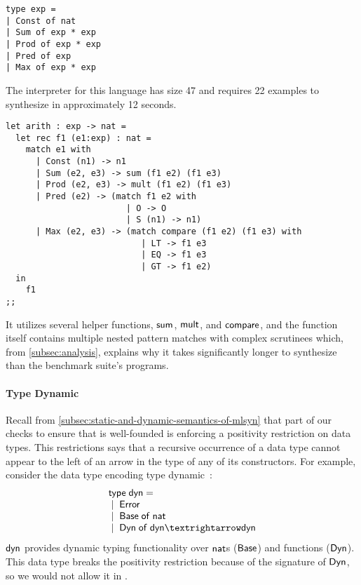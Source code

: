 \begin{center}
  \begin{minipage}{0.25\textwidth}
    \begin{lstlisting}
type exp =
| Const of nat
| Sum of exp * exp
| Prod of exp * exp
| Pred of exp
| Max of exp * exp
    \end{lstlisting}
  \end{minipage}
\end{center}

The interpreter for this language has size 47 and requires 22 examples to synthesize in approximately 12 seconds.

\begin{center}
  \begin{minipage}{0.75\textwidth}
    \begin{lstlisting}
let arith : exp -> nat =
  let rec f1 (e1:exp) : nat =
    match e1 with
      | Const (n1) -> n1
      | Sum (e2, e3) -> sum (f1 e2) (f1 e3)
      | Prod (e2, e3) -> mult (f1 e2) (f1 e3)
      | Pred (e2) -> (match f1 e2 with
                        | O -> O
                        | S (n1) -> n1)
      | Max (e2, e3) -> (match compare (f1 e2) (f1 e3) with
                           | LT -> f1 e3
                           | EQ -> f1 e3
                           | GT -> f1 e2)
  in
    f1
;;
    \end{lstlisting}
  \end{minipage}
\end{center}

It utilizes several helper functions, $\mathsf{sum}$, $\mathsf{mult}$, and $\mathsf{compare}$, and the function itself contains multiple nested pattern matches with complex scrutinees which, from \autoref{subsec:analysis}, explains why it takes significantly longer to synthesize than the benchmark suite's programs.

\paragraph{Type Dynamic}

Recall from \autoref{subsec:static-and-dynamic-semantics-of-mlsyn} that part of our checks to ensure that \mlsyn{} is well-founded is enforcing a positivity restriction on data types.
This restrictions says that a recursive occurrence of a data type cannot appear to the left of an arrow in the type of any of its constructors.
For example, consider the data type encoding type dynamic~:
\[
  \begin{array}{l}
    \mkwd{type}\;\mdyn = \\
    \bnfalt \mError \\
    \bnfalt \mBase\;\mof\;\mnat \\
    \bnfalt \mDyn\;\mof\;\mdyn → \mdyn
  \end{array}
\]
$\mathsf{dyn}$ provides dynamic typing functionality over $\mathsf{nat}$s ($\mathsf{Base}$) and functions ($\mathsf{Dyn}$).
This data type breaks the positivity restriction because of the signature of $\mathsf{Dyn}$, so we would not allow it in \mlsyn{}.

